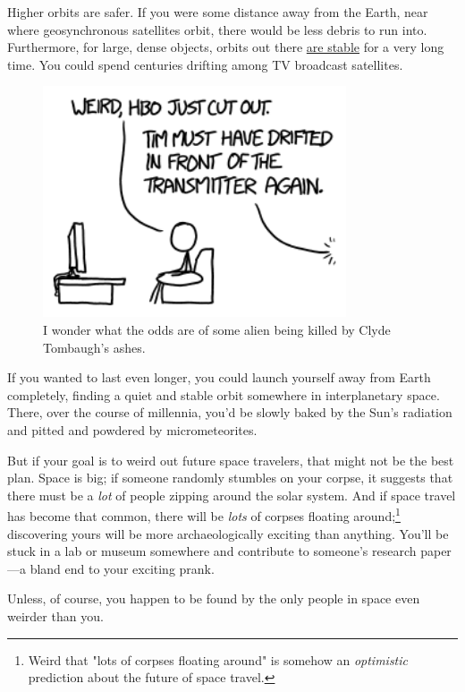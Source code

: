 {{Higher orbits are safer. If you were some distance away from the Earth, near where geosynchronous satellites orbit, there would be less debris to run into. Furthermore, for large, dense objects, orbits out there \href{http://www.readcube.com/articles/10.1029\%2F92JE00032?show\_checkout=1}{are stable} for a very long time. You could spend centuries drifting among TV broadcast satellites.}

\begin{figure}[!htbp]
\centering
\includegraphics[scale=0.5, max width=0.8\textwidth]{imgs/a/134/hbo.png}
\caption{I wonder what the odds are of some alien being killed by Clyde Tombaugh's ashes.}
\end{figure}

{If you wanted to last even longer, you could launch yourself away from Earth completely, finding a quiet and stable orbit somewhere in interplanetary space. There, over the course of millennia, you'd be slowly baked by the Sun's radiation and pitted and powdered by micrometeorites.}

{But if your goal is to weird out future space travelers, that might not be the best plan. Space is big; if someone randomly stumbles on your corpse, it suggests that there must be a \emph{lot} of people zipping around the solar system. And if space travel has become that common, there will be \emph{lots} of corpses floating around;{\footnote{Weird that "lots of corpses floating around" is somehow an \emph{optimistic} prediction about the future of space travel.} } discovering yours will be more archaeologically exciting than anything. You'll be stuck in a lab or museum somewhere and contribute to someone's research paper—a bland end to your exciting prank.}

{Unless, of course, you happen to be found by the only people in space even weirder than you.}

}
